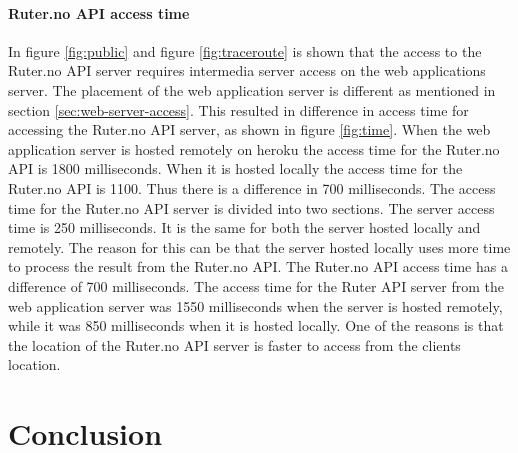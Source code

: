 \documentclass[10pt,a4paper]{article}
\begin{document}
\paragraph{Ruter.no API access time}
In figure \ref{fig:public} and figure \ref{fig:traceroute} is shown that the access to the Ruter.no API server requires intermedia server access on the web applications server. The placement of the web application server is different as mentioned in section \ref{sec:web-server-access}. This resulted in difference in access time for accessing the Ruter.no API server, as shown in figure \ref{fig:time}. When the web application server is hosted remotely on heroku the access time for the Ruter.no API is 1800 milliseconds. When it is hosted locally the access time for the Ruter.no API is 1100. Thus there is a difference in 700 milliseconds. The access time for the Ruter.no API server is divided into two sections. The server access time is 250 milliseconds. It is the same for both the server hosted locally and remotely. The reason for this can be that the server hosted locally uses more time to process the result from the Ruter.no API. The Ruter.no API access time has a difference of 700 milliseconds. The access time for the Ruter API server from the web application server was 1550 milliseconds when the server is hosted remotely, while it was 850 milliseconds when it is hosted locally. One of the reasons is that the location of the Ruter.no API server is faster to access from the clients location. 



\section{Conclusion}

\newpage
\printbibliography
\end{document}

